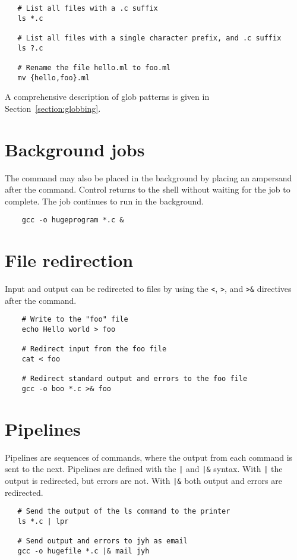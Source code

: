 \begin{verbatim}
   # List all files with a .c suffix
   ls *.c

   # List all files with a single character prefix, and .c suffix
   ls ?.c

   # Rename the file hello.ml to foo.ml
   mv {hello,foo}.ml
\end{verbatim}

A comprehensive description of \OMake{} glob patterns is given in Section~\ref{section:globbing}.

\section{Background jobs}

The command may also be placed in the background by placing an ampersand after the command.  Control
returns to the shell without waiting for the job to complete.  The job continues to run in the
background.

\begin{verbatim}
    gcc -o hugeprogram *.c &
\end{verbatim}

\section{File redirection}

Input and output can be redirected to files by using the \verb+<+, \verb+>+, and \verb+>&+
directives after the command.

\begin{verbatim}
    # Write to the "foo" file
    echo Hello world > foo

    # Redirect input from the foo file
    cat < foo

    # Redirect standard output and errors to the foo file
    gcc -o boo *.c >& foo
\end{verbatim}

\section{Pipelines}

Pipelines are sequences of commands, where the output from each command is sent to the next.
Pipelines are defined with the \verb+|+ and \verb+|&+ syntax.  With \verb+|+ the output is
redirected, but errors are not.  With \verb+|&+ both output and errors are redirected.

\begin{verbatim}
   # Send the output of the ls command to the printer
   ls *.c | lpr

   # Send output and errors to jyh as email
   gcc -o hugefile *.c |& mail jyh
\end{verbatim}

